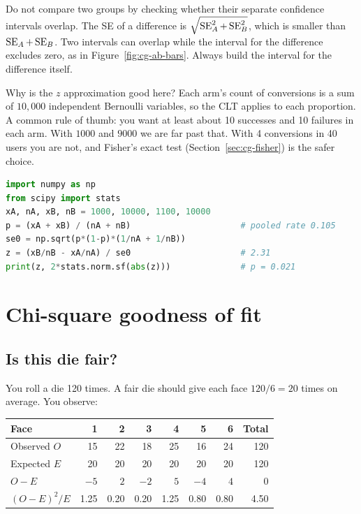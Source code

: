 \begin{trapbox}
Do not compare two groups by checking whether their separate confidence
intervals overlap. The SE of a difference is
$\sqrt{\operatorname{SE}_A^2 + \operatorname{SE}_B^2}$, which is smaller than $\operatorname{SE}_A + \operatorname{SE}_B$. Two
intervals can overlap while the interval for the difference excludes zero, as in
Figure~\ref{fig:cg-ab-bars}. Always build the interval for the difference itself.
\end{trapbox}

\begin{whybox}
Why is the $z$ approximation good here? Each arm's count of conversions is a
sum of $10{,}000$ independent Bernoulli variables, so the CLT applies to each
proportion. A common rule of thumb: you want at least about 10 successes and 10
failures in each arm. With $1000$ and $9000$ we are far past that. With 4
conversions in 40 users you are not, and Fisher's exact test
(Section~\ref{sec:cg-fisher}) is the safer choice.
\end{whybox}

\begin{lstlisting}[language=Python]
import numpy as np
from scipy import stats
xA, nA, xB, nB = 1000, 10000, 1100, 10000
p = (xA + xB) / (nA + nB)                      # pooled rate 0.105
se0 = np.sqrt(p*(1-p)*(1/nA + 1/nB))
z = (xB/nB - xA/nA) / se0                      # 2.31
print(z, 2*stats.norm.sf(abs(z)))              # p = 0.021
\end{lstlisting}

\section{Chi-square goodness of fit}
\label{sec:cg-gof}

\subsection{Is this die fair?}

You roll a die 120 times. A fair die should give each face $120/6 = 20$
times on average. You observe:

\begin{center}
\begin{tabular}{lrrrrrr|r}
\toprule
Face & 1 & 2 & 3 & 4 & 5 & 6 & Total \\
\midrule
Observed $O$ & 15 & 22 & 18 & 25 & 16 & 24 & 120 \\
Expected $E$ & 20 & 20 & 20 & 20 & 20 & 20 & 120 \\
$O - E$ & $-5$ & $2$ & $-2$ & $5$ & $-4$ & $4$ & 0 \\
$(O-E)^2/E$ & 1.25 & 0.20 & 0.20 & 1.25 & 0.80 & 0.80 & 4.50 \\
\bottomrule
\end{tabular}
\end{center}

